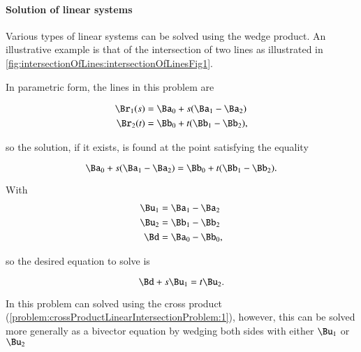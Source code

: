 
\paragraph{Solution of linear systems}

Various types of linear systems can be solved using the wedge product.  An illustrative example is that of the intersection of two lines as illustrated in \cref{fig:intersectionOfLines:intersectionOfLinesFig1}.


In parametric form, the lines in this problem are

\begin{dmath}\label{eqn:SimpleProducts2:1000}
\begin{aligned}
\Br_1(s) &= \Ba_0 + s( \Ba_1 - \Ba_2 ) \\
\Br_2(t) &= \Bb_0 + t( \Bb_1 - \Bb_2 ),
\end{aligned}
\end{dmath}

so the solution, if it exists, is found at the point satisfying the equality

\begin{dmath}\label{eqn:SimpleProducts2:1020}
\Ba_0 + s( \Ba_1 - \Ba_2 ) = \Bb_0 + t( \Bb_1 - \Bb_2 ).
\end{dmath}

With
\begin{dmath}\label{eqn:SimpleProducts2:1040}
\begin{aligned}
\Bu_1 &= \Ba_1 - \Ba_2 \\
\Bu_2 &= \Bb_1 - \Bb_2 \\
\Bd &= \Ba_0 - \Bb_0,
\end{aligned}
\end{dmath}

so the desired equation to solve is

\begin{dmath}\label{eqn:SimpleProducts2:1060}
\Bd + s \Bu_1 = t \Bu_2.
\end{dmath}

In  this problem can solved using the cross product (\cref{problem:crossProductLinearIntersectionProblem:1}), however, this can be solved more generally as a
bivector equation by wedging both sides with either \( \Bu_1 \) or \( \Bu_2 \)

